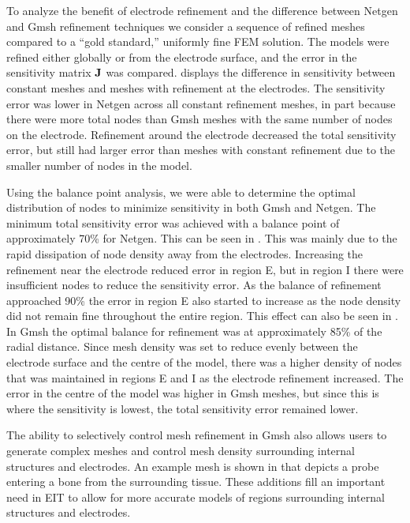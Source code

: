 To analyze the benefit of electrode refinement and the difference between 
Netgen and Gmsh refinement techniques we consider
a sequence of refined meshes compared to a ``gold standard,'' uniformly fine
FEM solution. The models were refined either globally or from the electrode surface, 
and the error in the sensitivity matrix $\bf J$ 
was compared.  displays the difference 
in sensitivity between constant meshes and meshes with refinement at the electrodes. 
The sensitivity error was lower in Netgen across all constant refinement meshes, in
part because there were more total nodes than Gmsh meshes with the same number
of nodes on the electrode. Refinement around the electrode decreased the total 
sensitivity error, but still had larger error than meshes with constant refinement 
due to the smaller number of nodes in the model. 

Using the balance point analysis, we were able to determine the optimal distribution
of nodes to minimize sensitivity in both Gmsh and Netgen. The minimum total sensitivity 
error was achieved with a balance point of approximately 70\% for Netgen. This can be seen in .
This was mainly 
due to the rapid dissipation of node density away from the electrodes. Increasing 
the refinement near the electrode reduced
error in region E, but in region I there were insufficient
nodes to reduce the sensitivity error. As the balance of refinement approached
90\% the error in region E also started to increase as the node density did not remain
fine throughout the entire region. This effect can also be seen in .
In Gmsh the optimal balance for refinement was at approximately 85\%
of the radial distance. Since mesh density was set to reduce evenly 
between the electrode surface and the centre of the model, there 
was a higher density of nodes that was maintained in regions E and I as the 
electrode refinement increased. The error in the centre of the model 
was higher in Gmsh meshes, but since this is where the sensitivity is 
lowest, the total sensitivity error remained lower. 

The ability to selectively control mesh refinement in Gmsh also allows 
users to generate complex meshes and control mesh density surrounding internal structures 
and electrodes. An example mesh is shown in  
that depicts 
a probe entering a bone from the surrounding tissue. 
These additions fill an important need in EIT to allow for more accurate models 
of regions surrounding internal structures and electrodes.

